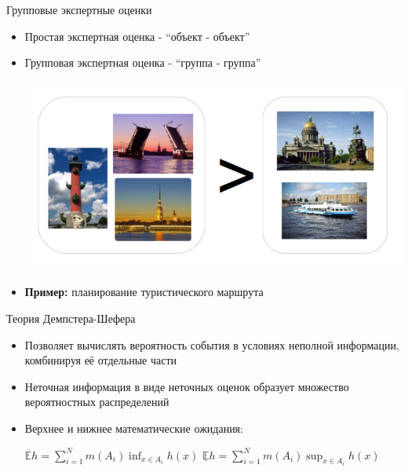 \documentclass[11pt]{beamer}
\begin{document}
\begin{frame}{Групповые экспертные оценки}

\begin{itemize}
	\item Простая экспертная оценка - ``объект - объект''
	\item Групповая экспертная оценка - ``группа - группа''
	\begin{center}
			\includegraphics[scale=0.4]{interval_judgment}
		\end{center}
	\item \textbf{Пример:} планирование туристического маршрута
\end{itemize}

\end{frame}
\begin{frame}{Теория Демпстера-Шефера}

\begin{itemize}
	\item Позволяет вычислять вероятность события в условиях неполной информации, комбинируя её отдельные части
	\item Неточная информация в виде неточных оценок образует множество вероятностных распределений \linebreak
	\item Верхнее и нижнее математические ожидания:
	\begin{center}
	\(\mathbb{\overline{E}} h = \sum \limits_{i=1}^N m(A_i) \inf_{x \in A_i} h(x)\) \linebreak
	\(\mathbb{\underline{E}} h = \sum \limits_{i=1}^N m(A_i) \sup_{x \in A_i} h(x)\)
	\end{center}
\end{itemize}

\end{frame}
\end{document}

